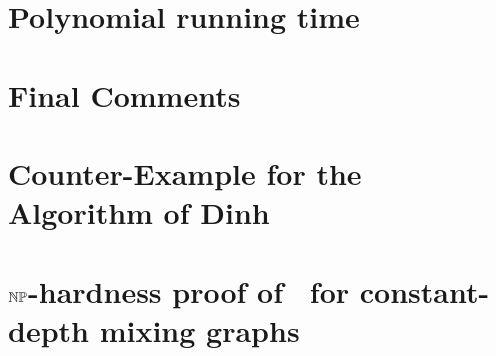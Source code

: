 \documentclass[a4paper,UKenglish]{lipics-v2018}
\begin{document}

\section{Polynomial running time}
\label{sec: polynomial running time}



\section{Final Comments}
\label{sec: final comments}



%
%




\appendix

\section{Counter-Example for the Algorithm of Dinh~{\etal}~\cite{dinh2014network}}
\label{sec: counter-example for algorihtm of Dinh}



\section{${\mathbb{NP}}$-hardness proof of \MixReachability~for constant-depth mixing graphs}
\label{sec: NP-hardness}

\end{document}
